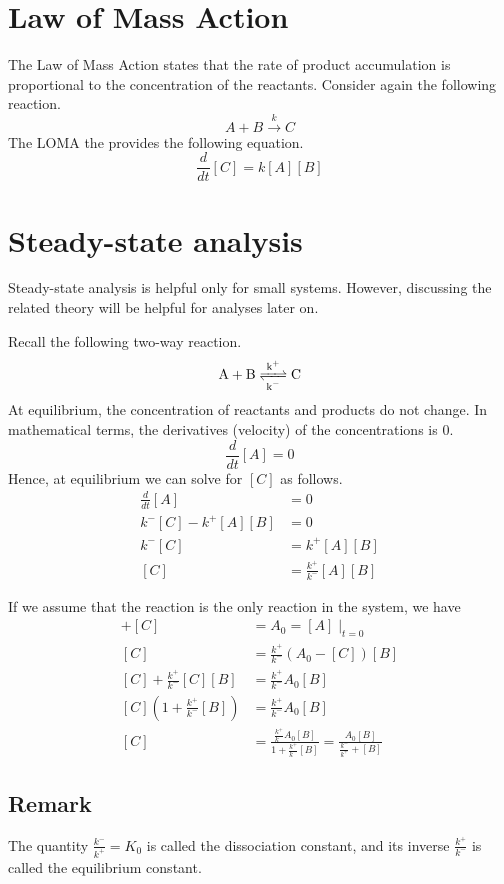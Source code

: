\documentclass[10pt]{article}
\begin{document}
\section*{Law of Mass Action}
The Law of Mass Action states that the rate of product accumulation is proportional to the concentration of the reactants.
Consider again the following reaction. \[ A + B \xrightarrow{k} C \]
The LOMA the provides the following equation. \[ \frac{d}{dt}[C] = k[A][B] \]

\section*{Steady-state analysis}
Steady-state analysis is helpful only for small systems.
However, discussing the related theory will be helpful for analyses later on.

Recall the following two-way reaction. \[ \ce{A + B <=>[k^{+}][k^{-}] C} \]
At equilibrium, the concentration of reactants and products do not change.
In mathematical terms, the derivatives (velocity) of the concentrations is 0. \[ \frac{d}{dt}[A] = 0 \] %
Hence, at equilibrium we can solve for $[C]$ as follows.
\begin{align*}
       \frac{d}{dt}[A] &= 0                         \\
k^{-}[C] - k^{+}[A][B] &= 0                         \\
              k^{-}[C] &= k^{+}[A][B]               \\
                   [C] &= \frac{k^{+}}{k^{-}}[A][B]
\end{align*}

If we assume that the reaction is the only reaction in the system, we have
\begin{align*}
                      [A] + [C] &= A_0 = [A]\mid_{t=0}               \\
                            [C] &= \frac{k^{+}}{k^{-}}(A_0 - [C])[B] \\
[C] + \frac{k^{+}}{k^{-}}[C][B] &= \frac{k^{+}}{k^{-}}A_0[B]         \\
[C](1 + \frac{k^{+}}{k^{-}}[B]) &= \frac{k^{+}}{k^{-}}A_0[B]         \\
                            [C] &= \frac{\frac{k^{+}}{k^{-}}A_0[B]}{1+\frac{k^{+}}{k^{-}}[B]} = \frac{A_0[B]}{\frac{k^{-}}{k^{+}} + [B]}
\end{align*}

\subsection*{Remark}
The quantity $\frac{k^{-}}{k^{+}} = K_0$ is called the dissociation constant, and its inverse $\frac{k^{+}}{k^{-}}$ is called the equilibrium constant.
\end{document}
